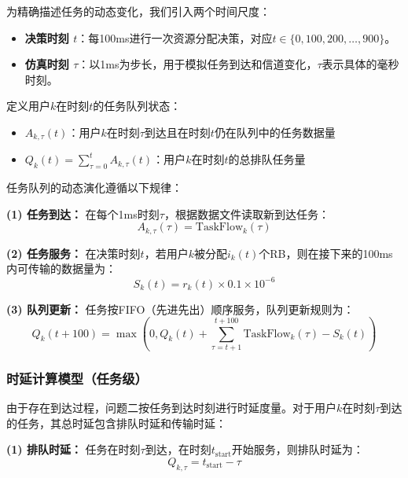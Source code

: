 为精确描述任务的动态变化，我们引入两个时间尺度：
\begin{itemize}
    \item \textbf{决策时刻 $t$}：每100ms进行一次资源分配决策，对应$t \in \{0, 100, 200, \ldots, 900\}$。
    \item \textbf{仿真时刻 $\tau$}：以1ms为步长，用于模拟任务到达和信道变化，$\tau$表示具体的毫秒时刻。
\end{itemize}

定义用户$k$在时刻$t$的任务队列状态：

\begin{itemize}
  \item $A_{k,\tau}(t)$：用户$k$在时刻$\tau$到达且在时刻$t$仍在队列中的任务数据量
  \item $Q_k(t) = \sum_{\tau=0}^{t} A_{k,\tau}(t)$：用户$k$在时刻$t$的总排队任务量
\end{itemize}

任务队列的动态演化遵循以下规律：

\textbf{(1) 任务到达：}
在每个1ms时刻$\tau$，根据数据文件读取新到达任务：
\begin{equation}
A_{k,\tau}(\tau) = \text{TaskFlow}_k(\tau)
\end{equation}

\textbf{(2) 任务服务：}
在决策时刻$t$，若用户$k$被分配$i_k(t)$个RB，则在接下来的100ms内可传输的数据量为：
\begin{equation}
S_k(t) = r_k(t) \times 0.1 \times 10^{-6} 
\end{equation}

\textbf{(3) 队列更新：}
任务按FIFO（先进先出）顺序服务，队列更新规则为：
\begin{equation}
\label{eq:queue_evolution}
Q_k(t+100) = \max\left(0, Q_k(t) + \sum_{\tau=t+1}^{t+100} \text{TaskFlow}_k(\tau) - S_k(t)\right)
\end{equation}

\subsubsection{时延计算模型（任务级）}
 
由于存在到达过程，问题二按任务到达时刻进行时延度量。对于用户$k$在时刻$\tau$到达的任务，其总时延包含排队时延和传输时延：

\textbf{(1) 排队时延：}
任务在时刻$\tau$到达，在时刻$t_{\text{start}}$开始服务，则排队时延为：
\begin{equation}
Q_{k,\tau} = t_{\text{start}} - \tau
\end{equation}

